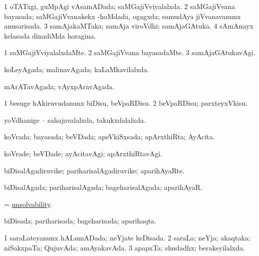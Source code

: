 \bentry
{} 
\gl{\gu}
\expl{}
\bmng
\bnum
\num{1} oTATxgi, guMpAgi vAsamADada; saMGajiVviyalalxda. 
\num{2} saMGajiVvana bayasada; saMGajiVvanakekx -hoMdada, ogagxda; samudAya jiVvanavanunx anusarisada. 
\num{3} samAjakaMTaka; samAja viroVdhi; samAjaGAtuka. 
\num{4} sAmAnayx kelasada dinadiMda horagina. 
\enum
\emng
\eentry

\bentry
{} 
\gl{\kirxvi}
\expl{}
\bmng
\bnum
\num{1} saMGajiVviyalalxdaMte. 
\num{2} saMGajiVvana bayasadaMte. 
\num{3} samAjaGAtukavAgi. 
\enum
\emng
\eentry

\bentry
{} 
\gl{\gu}
\expl{}
\bmng
koLeyAgada; malinavAgada; kaLaMkavilalxda. 
\emng
\eentry

\bentry
{} 
\gl{\gu}
\expl{}
\bmng
mArATavAgada; vAyxpAravAgada. 
\emng
\eentry

\bentry
{} 
\gl{\sakirx}
\expl{}
\bmng
\bnum
\num{1} besuge hAkiruvudanunx biDisu, beVpaRDisu. 
\num{2} beVpaRDisu; parxteyxVkisu. 
\enum
\emng
\eentry

\bentry
{} 
\gl{\gu}
\expl{}
\bmng
yoVdhanige -- sahajavalalxda, takukxdalalxda. 
\emng
\eentry

\bentry
{} 
\gl{\gu}
\expl{}
\bmng
koVrada; bayasada; beVDada; apeVkiSxsada; apArxthiRta; AyAcita. 
\emng
\eentry

\bentry
{} 
\gl{\kirxvi}
\expl{}
\bmng
koVrade; beVDade; ayAcitavAgi; apArxthiRtavAgi. 
\emng
\eentry

\bentry
{} 
\gl{\nA}
\expl{}
\bmng
biDisalAgadiruvike; pariharisalAgadiruvike; aparihAyaRte. 
\emng
\eentry

\bentry
{} 
\gl{\gu}
\expl{}
\bmng
biDisalAgada; pariharisalAgada; bageharisalAgada; aparihAyaR. 
\emng
\eentry

\bentry
{} 
\gl{\nA}
\expl{}
\bmng
= \hyperlink{unsolvability}{unsolvability}. 
\emng
\eentry

\bentry
{} 
\gl{\gu}
\expl{}
\bmng
biDisada; pariharisada; bageharisada; aparihaqta. 
\emng
\eentry

\bentry
{} 
\gl{\gu}
\expl{}
\bmng
\bnum
\num{1} saraLateyanunx hALumADada; neYjate keDisada. 
\num{2} saraLa; neYja; akaqtaka; niSakxpaTa; QujuvAda; amAyakavAda. 
\num{3} apapxTa; shudadhx; berakeyilalxda. 
\enum
\emng
\eentry


